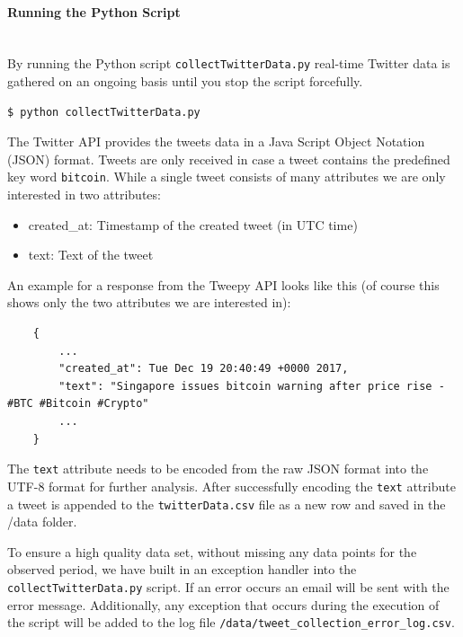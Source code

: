 \documentclass[a4paper,12pt]{article}
\begin{document}
\begin{spacing}{1.2}
\paragraph{Running the Python Script}\mbox{}\\{}
By running the Python script \verb|collectTwitterData.py| real-time Twitter data is gathered on an ongoing basis until you stop the script forcefully.
\begin{lstlisting}[language=bash]
    $ python collectTwitterData.py
    \end{lstlisting}

The Twitter API provides the tweets data in a Java Script Object Notation (JSON) format. Tweets are only received in case a tweet contains the predefined key word \verb|bitcoin|. While a single tweet consists of many attributes we are only interested in two attributes:
\begin{itemize}
    \item created\_at: Timestamp of the created tweet (in UTC time)
    \item text: Text of the tweet
\end{itemize}

An example for a response from the Tweepy API looks like this (of course this shows only the two attributes we are interested in):
\begin{lstlisting}
    {
        ...
        "created_at": Tue Dec 19 20:40:49 +0000 2017, 
        "text": "Singapore issues bitcoin warning after price rise - #BTC #Bitcoin #Crypto"
        ...
    }
\end{lstlisting}

The \verb|text| attribute needs to be encoded from the raw JSON format into the UTF-8 format for further analysis. After successfully encoding the \verb|text| attribute a tweet is appended to the \verb|twitterData.csv| file as a new row and saved in the /data folder.

To ensure a high quality data set, without missing any data points for the observed period, we have built in an exception handler into the \verb|collectTwitterData.py| script. If an error occurs an email will be sent with the error message. Additionally, any exception that occurs during the execution of the script will be added to the log file \verb|/data/tweet_collection_error_log.csv|.


\end{spacing}
\end{document}
